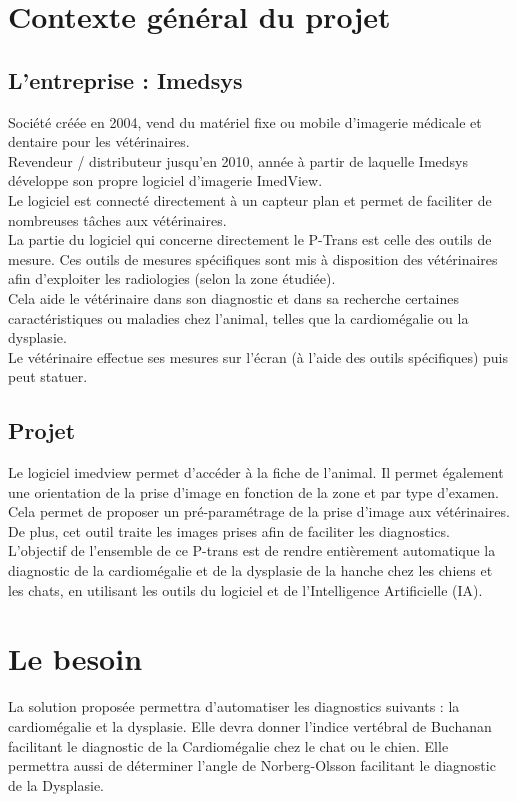 \documentclass[a4paper, 11pt]{report}
\begin{document}
\section*{Contexte général du projet}
\subsection*{L'entreprise : Imedsys}
Société créée en 2004, vend du matériel fixe ou mobile d'imagerie médicale et dentaire pour les vétérinaires. \\
Revendeur / distributeur jusqu'en 2010, année à partir de laquelle Imedsys développe son propre logiciel d'imagerie ImedView. \\
Le logiciel est connecté directement à un capteur plan et permet de faciliter de nombreuses tâches aux vétérinaires. \\
La partie du logiciel qui concerne directement le P-Trans est celle des outils de mesure.
Ces outils de mesures spécifiques sont mis à disposition des vétérinaires
afin d'exploiter les radiologies (selon la zone étudiée). \\
Cela aide le vétérinaire dans son diagnostic et dans sa recherche  certaines caractéristiques ou maladies chez l'animal, telles que la cardiomégalie ou la dysplasie. \\
Le vétérinaire effectue ses mesures sur l'écran (à l'aide des outils spécifiques) puis peut statuer.

\subsection*{Projet}
Le logiciel imedview permet d'accéder à la fiche de l'animal. Il permet également une orientation de la prise d'image en fonction de la zone et par type d'examen. Cela permet de proposer un pré-paramétrage de la prise d'image aux vétérinaires. De plus, cet outil traite les images prises afin de faciliter les diagnostics. L'objectif de l'ensemble de ce P-trans est de rendre entièrement automatique la diagnostic de la cardiomégalie et de la dysplasie de la hanche chez les chiens et les chats, en utilisant les outils du logiciel et de l'Intelligence Artificielle (IA).

\section*{Le besoin}
La solution proposée permettra d'automatiser les diagnostics suivants : la cardiomégalie et la dysplasie.
Elle devra donner l'indice vertébral de Buchanan facilitant le diagnostic de la Cardiomégalie chez le chat ou le chien.
Elle permettra aussi de déterminer l'angle de Norberg-Olsson facilitant le diagnostic de la Dysplasie.
\end{document}
